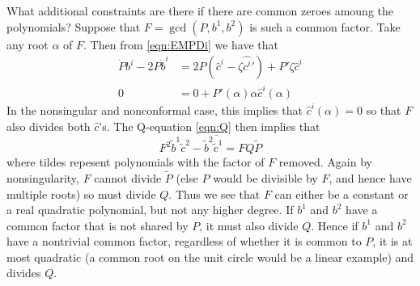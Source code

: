 What additional constraints are there if there are common zeroes amoung the polynomials? Suppose that $F = \gcd(P,b^1,b^2)$ is such a common factor. Take any root $α$ of $F$. Then from \eqref{eqn:EMPDi} we have that
\begin{align}
\dot P b^i - 2P\dot b^i &= 2P\left( \hat c^i - \zeta\hat {c^i}'\right) + P'\zeta\hat c^i \\
0 &= 0 + P'(α)α\hat c^i(α)
\end{align}
In the nonsingular and nonconformal case, this implies that $\hat c^i(α) = 0$ so that $F$ also divides both $\hat c$'s. The Q-equation \eqref{eqn:Q} then implies that
\[
F^2 \bar{\tilde{b}^1\tilde{c}^2 - \tilde{b}^2\tilde{c}^1 = F Q \tilde{P}}
\]
where tildes repesent polynomials with the factor of $F$ removed. Again by nonsingularity, $F$ cannot divide $\tilde{P}$ (else $P$ would be divisible by $F$, and hence have multiple roots) so must divide $Q$. Thus we see that $F$ can either be a constant or a real quadratic polynomial, but not any higher degree. If $b^1$ and $b^2$ have a common factor that is not shared by $P$, it must also divide $Q$. Hence if $b^1$ and $b^2$ have a nontrivial common factor, regardless of whether it is common to $P$, it is at most quadratic (a common root on the unit circle would be a linear example) and divides $Q$.

























